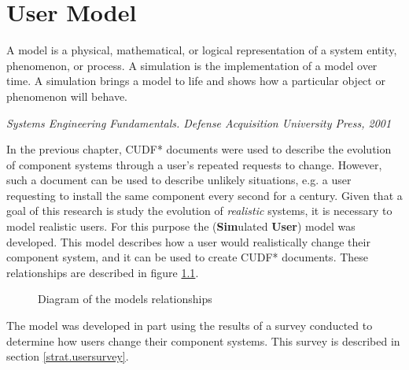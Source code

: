 \chapter{User Model}
\label{simulation}
\epigraph{A model is a physical, mathematical, or logical representation of a system entity, phenomenon, or process. 
A simulation is the implementation of a model over time. 
A simulation brings a model to life and shows how a particular object or phenomenon will behave.}
{\textit{Systems Engineering Fundamentals. Defense Acquisition University Press, 2001}}

In the previous chapter, CUDF* documents were used to describe the evolution of component systems through a user's repeated requests to change.
However, such a document can be used to describe unlikely situations,
e.g. a user requesting to install the same component every second for a century.
Given that a goal of this research is study the evolution of \textit{realistic} systems,
it is necessary to model realistic users. 
For this purpose the \usermodel (\textbf{Sim}ulated \textbf{User}) model was developed.
This model describes how a user would realistically change their component system,
and it can be used to create CUDF* documents.
These relationships are described in figure \ref{sim.modeldiagram}.

\begin{figure}[htp]
\begin{center}
  \caption{Diagram of the \usermodel models relationships}
  \label{sim.modeldiagram}
\end{center}
\end{figure}

The \usermodel model was developed in part using the results of a survey conducted to determine how users change their component systems.
This survey is described in section \ref{strat.usersurvey}.


